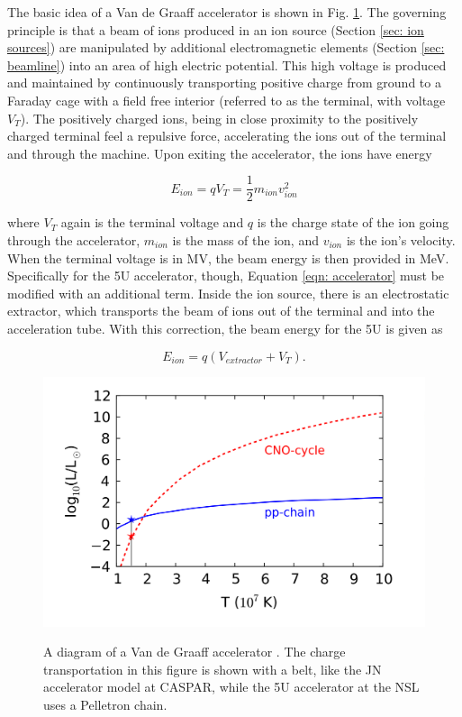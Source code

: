 The basic idea of a Van de Graaff accelerator is shown in Fig. \ref{fig: vdg principles}. The governing principle is that a beam of ions produced in an ion source (Section \ref{sec: ion sources}) are manipulated by additional electromagnetic elements (Section \ref{sec: beamline}) into an area of high electric potential. This high voltage is produced and maintained by continuously transporting positive charge from ground to a Faraday cage with a field free interior (referred to as the terminal, with voltage $V_{T}$). The positively charged ions, being in close proximity to the positively charged terminal feel a repulsive force, accelerating the ions out of the terminal and through the machine. Upon exiting the accelerator, the ions have energy

\begin{equation}
E_{ion} = qV_{T} = \dfrac{1}{2} m_{ion} v_{ion}^{2}
\label{eqn: accelerator}
\end{equation}

\noindent where $V_{T}$ again is the terminal voltage and $q$ is the charge state of the ion going through the accelerator, $m_{ion}$ is the mass of the ion, and $v_{ion}$ is the ion's velocity. When the terminal voltage is in MV, the beam energy is then provided in MeV. Specifically for the 5U accelerator, though, Equation \ref{eqn: accelerator} must be modified with an additional term. Inside the ion source, there is an electrostatic extractor, which transports the beam of ions out of the terminal and into the acceleration tube. With this correction, the beam energy for the 5U is given as

\begin{equation}
E_{ion} = q(V_{extractor} + V_{T}).
\label{eqn: beam energy}
\end{equation}

\begin{figure}
\includegraphics[width=\linewidth]{figures/energyProduction.png}
\label{fig: vdg principles}
\caption{A diagram of a Van de Graaff accelerator \cite{RolfsBook}. The charge transportation in this figure is shown with a belt, like the JN accelerator model at CASPAR, while the 5U accelerator at the NSL uses a Pelletron chain. }
\end{figure}

